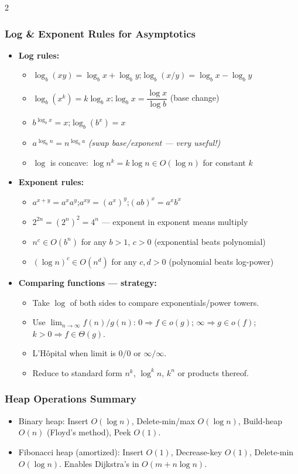 \documentclass[9pt]{article}
\begin{document}
\begin{multicols}{2}
\subsubsection*{Log \& Exponent Rules for Asymptotics}

\begin{itemize}
  \item \textbf{Log rules:}
  \begin{itemize}
    \item $\log_b(xy)=\log_bx+\log_by$;\quad $\log_b(x/y)=\log_bx-\log_by$
    \item $\log_b(x^k)=k\log_bx$;\quad $\log_bx=\dfrac{\log x}{\log b}$ (base change)
    \item $b^{\log_b x}=x$;\quad $\log_b(b^x)=x$
    \item $a^{\log_b n}=n^{\log_b a}$ \textit{(swap base/exponent — very useful!)}
    \item $\log$ is concave: $\log n^k=k\log n\in O(\log n)$ for constant $k$
  \end{itemize}
  \item \textbf{Exponent rules:}
  \begin{itemize}
    \item $a^{x+y}=a^xa^y$;\quad $a^{xy}=(a^x)^y$;\quad $(ab)^x=a^xb^x$
    \item $2^{2n}=(2^n)^2=4^n$ — exponent in exponent means multiply
    \item $n^c\in O(b^n)$ for any $b>1$, $c>0$ (exponential beats polynomial)
    \item $(\log n)^c\in O(n^d)$ for any $c,d>0$ (polynomial beats log-power)
  \end{itemize}
  \item \textbf{Comparing functions — strategy:}
  \begin{itemize}
    \item Take $\log$ of both sides to compare exponentials/power towers.
    \item Use $\lim_{n\to\infty} f(n)/g(n)$: $0\Rightarrow f\in o(g)$;\; $\infty\Rightarrow g\in o(f)$;\; $k>0\Rightarrow f\in\Theta(g)$.
    \item L'Hôpital when limit is $0/0$ or $\infty/\infty$.
    \item Reduce to standard form $n^k$, $\log^k n$, $k^n$ or products thereof.
  \end{itemize}
\end{itemize}

\subsubsection*{Heap Operations Summary}

\begin{itemize}
  \item Binary heap: Insert $O(\log n)$, Delete-min/max $O(\log n)$, Build-heap $O(n)$ (Floyd's method), Peek $O(1)$.
  \item Fibonacci heap (amortized): Insert $O(1)$, Decrease-key $O(1)$, Delete-min $O(\log n)$. Enables Dijkstra's in $O(m+n\log n)$.
\end{itemize}


\end{multicols}
\end{document}
